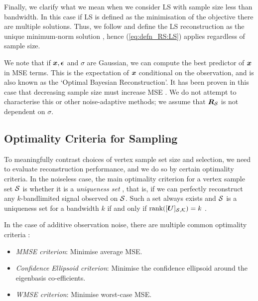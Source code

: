 Finally, we clarify what we mean when we consider LS with sample size less than bandwidth. {\color{black} In this case }if LS is defined as the minimisation of the objective \bs{(\ref{eq:LS_Defn})} there are multiple solutions. Thus, we follow \cite{anis2016efficient} and define the LS reconstruction as the 
unique minimum-norm solution \cite[Sect. 5.5.1]{golub13}, hence (\ref{eq:defn_RS:LS}) applies regardless of sample size. 

{\color{black}
\begin{remark}    
We note that if $\bm{x}, \bm{\epsilon}$ and $\sigma$ are Gaussian, we can compute the best predictor of $\bm{x}$ in MSE terms. This is the expectation of $\bm{x}$ conditional on the observation, and is also known as the `Optimal Bayesian Reconstruction'. It has been proven in this case that decreasing sample size must increase MSE \cite{chamon2017greedy}. We do not attempt to characterise this or other noise-adaptive methods; we assume that $\bm{R}_{\mathcal{S}}$ is not dependent on $\sigma$.
\end{remark}
}

 
\subsection{Optimality Criteria for Sampling}
\label{sec:Optimality_Criteria}
To meaningfully contrast choices of vertex sample set size and selection, we need to evaluate reconstruction performance, and we do so by certain optimality criteria. In the noiseless case, the main optimality criterion for a vertex sample set $\mathcal{S}$ is whether it is a \emph{uniqueness set} 
 \cite{pesenson2008sampling}, that is, if we can perfectly reconstruct any $k$-bandlimited signal observed on $\mathcal{S}$. Such a set always exists and $\mathcal{S}$ is a uniqueness set for a bandwidth $k$ if and only if $\text{rank}(\matrsubU{S}) = k$ \cite{anis2016efficient}. 
 
 In the case of additive observation noise, there are multiple common optimality criteria \cite[Chapter 6]{pukelsheim2006optimal}:

\begin{itemize}
    \item \emph{MMSE criterion}: Minimise  average MSE. \cite{wang2018optimal,wang2019low, mfn}
    \item \emph{Confidence Ellipsoid criterion}: Minimise the confidence ellipsoid around the eigenbasis co-efficients. \cite{jayawant2021doptimal, tremblay2017determinantal, mfn}
    \item \emph{WMSE criterion}: Minimise worst-case MSE. \cite{bai2020fast, EOptimalChen}
\end{itemize}

